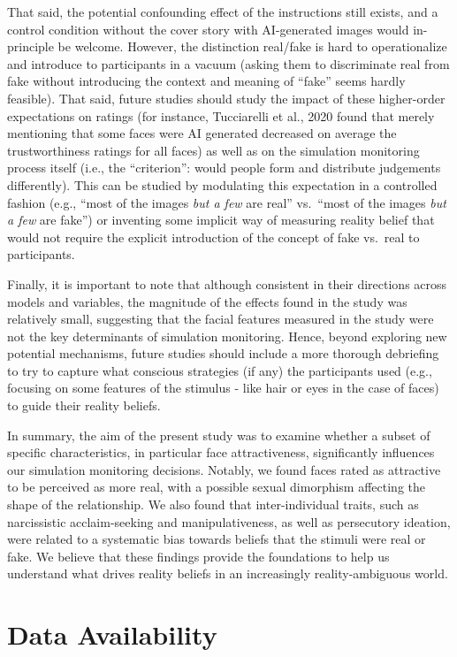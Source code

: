 \documentclass[
  man,floatsintext]{apa6}
\begin{document}
That said, the potential confounding effect of the instructions still exists, and a control condition without the cover story with AI-generated images would in-principle be welcome. However, the distinction real/fake is hard to operationalize and introduce to participants in a vacuum (asking them to discriminate real from fake without introducing the context and meaning of ``fake'' seems hardly feasible). That said, future studies should study the impact of these higher-order expectations on ratings (for instance, Tucciarelli et al., 2020 found that merely mentioning that some faces were AI generated decreased on average the trustworthiness ratings for all faces) as well as on the simulation monitoring process itself (i.e., the ``criterion'': would people form and distribute judgements differently). This can be studied by modulating this expectation in a controlled fashion (e.g., ``most of the images \emph{but a few} are real'' vs.~``most of the images \emph{but a few} are fake'') or inventing some implicit way of measuring reality belief that would not require the explicit introduction of the concept of fake vs.~real to participants.

Finally, it is important to note that although consistent in their directions across models and variables, the magnitude of the effects found in the study was relatively small, suggesting that the facial features measured in the study were not the key determinants of simulation monitoring. Hence, beyond exploring new potential mechanisms, future studies should include a more thorough debriefing to try to capture what conscious strategies (if any) the participants used (e.g., focusing on some features of the stimulus - like hair or eyes in the case of faces) to guide their reality beliefs.

In summary, the aim of the present study was to examine whether a subset of specific characteristics, in particular face attractiveness, significantly influences our simulation monitoring decisions. Notably, we found faces rated as attractive to be perceived as more real, with a possible sexual dimorphism affecting the shape of the relationship. We also found that inter-individual traits, such as narcissistic acclaim-seeking and manipulativeness, as well as persecutory ideation, were related to a systematic bias towards beliefs that the stimuli were real or fake. We believe that these findings provide the foundations to help us understand what drives reality beliefs in an increasingly reality-ambiguous world.

\hypertarget{data-availability}{%
\section{Data Availability}\label{data-availability}}
\end{document}
